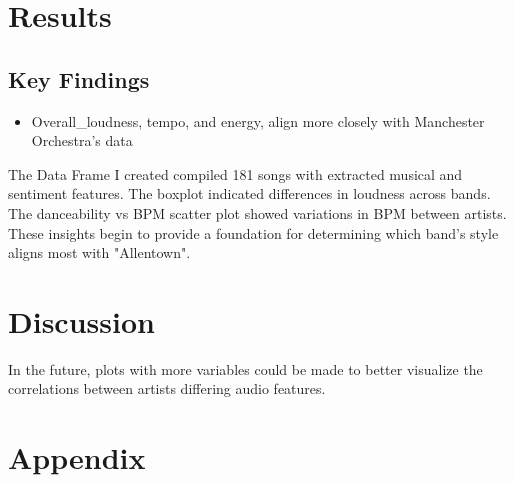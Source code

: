 \documentclass{article}\usepackage[]{graphicx}\usepackage[]{xcolor}
\begin{document}
\begin{multicols}{2}
\section{Results}
\subsection{Key Findings}
\begin{itemize}
\item Overall\_loudness, tempo, and energy, align more closely with Manchester Orchestra's data
\end{itemize}

The Data Frame I created compiled 181 songs with extracted musical and sentiment features. The boxplot indicated differences in loudness across bands. The danceability vs BPM scatter plot showed variations in BPM between artists. These insights begin to provide a foundation for determining which band's style aligns most with "Allentown".


\section{Discussion}

In the future, plots with more variables could be made to better visualize the correlations between artists differing audio features.

\vspace{2em}

\begin{tiny}

\end{tiny}
\end{multicols}

\newpage
\onecolumn
\section{Appendix}
\end{document}
